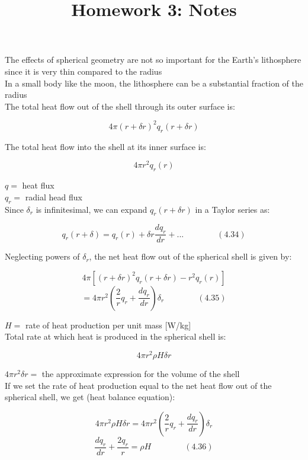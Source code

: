 \documentclass[12pt]{article}
\title{Homework 3: Notes}
\begin{document}
\maketitle

The effects of spherical geometry are not so important for the Earth’s lithosphere since it is very thin compared to the radius\\

In a small body like the moon, the lithosphere can be a substantial fraction of the radius\\

The total heat flow out of the shell through its outer surface is:

$$4\pi {\left( r+\delta r \right)}^ { 2} {q}_{r} \left( r + \delta r \right)$$

The total heat flow into the shell at its inner surface is:

$$4 \pi {r}^{2} {q}_{r} \left(r \right)$$

$q = $ heat flux\\
$q_{r} = $ radial head flux\\

Since $\delta_{r}$ is infinitesimal, we can expand $q_{r} \left(r + \delta r \right)$ in a Taylor series as:

$${ q }_{ r }\left( r+\delta  \right) ={ q }_{ r }\left( r \right) +\delta r\frac { dq_{ r } }{ dr } +... \qquad \qquad \left ( 4.34 \right)$$

Neglecting powers of $\delta_{r}$, the net heat flow out of the spherical shell is given by:

$$4 \pi \left[ {\left( r + \delta r \right)}^{2} {q}_{r} \left( r + \delta r \right) - {r}^{2} {q}_{r} \left( r \right) \right] $$
$$= 4 \pi {r}^{2} \left(\frac{2}{r} {q}_{r} + \frac{d {q}_{r}}{dr}\right) \delta_{r} \qquad \qquad (4.35)$$

$H = $ rate of heat production per unit mass [W/kg]\\

Total rate at which heat is produced in the spherical shell is:

$$4 \pi {r}^{2} \rho H \delta r$$

$4 \pi {r}^{2} \delta r = $ the approximate expression for the volume of the shell\\

If we set the rate of heat production equal to the net heat flow out of the spherical shell, we get (heat balance equation):

$$4 \pi {r}^{2} \rho H \delta r = 4 \pi {r}^{2} \left(\frac{2}{r} {q}_{r} + \frac{d {q}_{r}}{dr}\right) \delta_{r}$$
$$\frac{d{q}_{r}}{dr} + \frac{2 {q}_{r}}{r} = \rho H \qquad \qquad (4.36)$$
\end{document}
